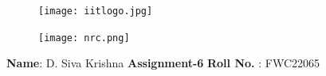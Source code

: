 \documentclass[10pt,a4paper]{report}
\begin{document}
\begin{figure}[!tbp]
  \centering
  \begin{minipage}[b]{0.4\textwidth}
    \texttt{[image: iitlogo.jpg]} 
  \end{minipage}
  \hfill
  \vspace{5mm}\begin{minipage}[b]{0.4\textwidth}
\raggedleft  \texttt{[image: nrc.png]}  \

  \end{minipage}\vspace{0.2cm}
\end{figure}
\raggedright \textbf{Name}:\hspace{1mm} D. Siva Krishna\hspace{3cm} \Large \textbf{Assignment-6}\hspace{2.5cm} %
\normalsize \textbf{Roll No.} :\hspace{1mm} FWC22065\vspace{1cm}
\end{document}

